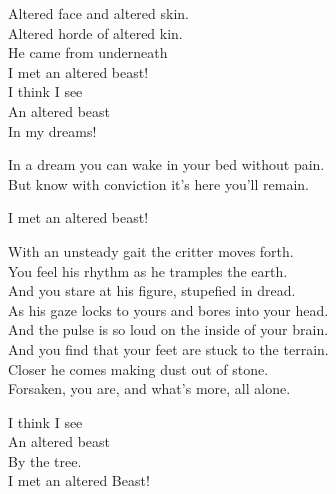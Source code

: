 Altered face and altered skin. \\
Altered horde of altered kin. \\

He came from underneath \\
I met an altered beast! \\

I think I see \\
An altered beast \\
In my dreams! \\


In a dream you can wake in your bed without pain. \\
But know with conviction it's here you'll remain. \\


I met an altered beast! \\


With an unsteady gait the critter moves forth. \\
You feel his rhythm as he tramples the earth. \\

And you stare at his figure, stupefied in dread. \\
As his gaze locks to yours and bores into your head. \\

And the pulse is so loud on the inside of your brain. \\
And you find that your feet are stuck to the terrain. \\

Closer he comes making dust out of stone. \\
Forsaken, you are, and what's more, all alone. \\


I think I see \\
An altered beast \\
By the tree. \\

I met an altered Beast! \\




